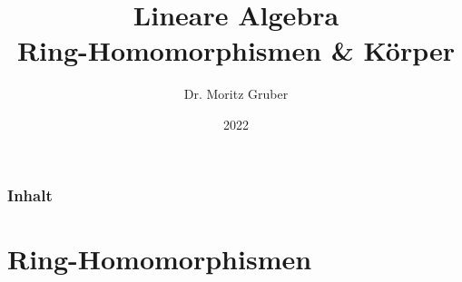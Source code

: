 


\title{Lineare Algebra\\[3mm] 
	\large Ring-Homomorphismen \& K\"orper
}
\author{Dr. Moritz Gruber } 
\date{2022}



%
\begin{frame}[plain] 
 \titlepage
\end{frame}
%
%
\begin{frame}\frametitle{Inhalt}
   \tableofcontents
\end{frame}
%


\section{Ring-Homomorphismen}

